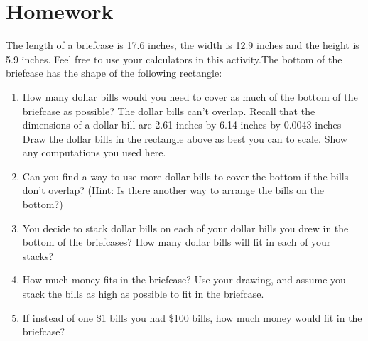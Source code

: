 \documentclass{article}
\begin{document}
\section*{Homework}
The length of a briefcase is 17.6 inches, the width is 12.9 inches and
the height is 5.9 inches.  Feel free to use your calculators in this
activity.The bottom of the briefcase has the shape of the following
rectangle:
\begin{enumerate}
\item How many dollar bills would you need to cover as much of the
  bottom of the briefcase as possible? The dollar bills can’t
  overlap. Recall that the dimensions of a dollar bill are 2.61 inches
  by 6.14 inches by 0.0043 inches Draw the dollar bills in the
  rectangle above as best you can to scale. Show any computations you
  used here.
\item Can you find a way to use more dollar bills to cover the bottom
  if the bills don’t overlap?  (Hint: Is there another way to arrange
  the bills on the bottom?)
\item You decide to stack dollar bills on each of your dollar bills
  you drew in the bottom of the briefcases? How many dollar bills will
  fit in each of your stacks?
\item How much money fits in the briefcase? Use your drawing, and
  assume you stack the bills as high as possible to fit in the
  briefcase.
\item If instead of one \$1 bills you had \$100 bills, how much money would fit in the briefcase?
\end{enumerate}
\end{document}
